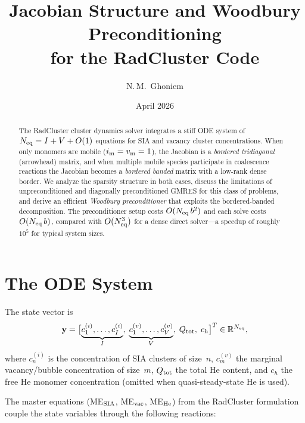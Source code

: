 \documentclass[11pt]{article}
\title{Jacobian Structure and Woodbury Preconditioning\\
for the RadCluster Code}
\author{N.\,M.\ Ghoniem}
\date{April 2026}
\newcommand{\Neq}{N_{\rm eq}}
\newcommand{\im}{i_{\rm m}}
\newcommand{\vm}{v_{\rm m}}
\newcommand{\bw}{b}
\newcommand{\RR}{\mathbb{R}}
\begin{document}
\maketitle

\begin{abstract}
The RadCluster cluster dynamics solver integrates a stiff ODE system
of $\Neq = I + V + O(1)$ equations for SIA and vacancy cluster
concentrations. When only monomers are mobile
($\im = \vm = 1$), the Jacobian is a
\emph{bordered tridiagonal} (arrowhead) matrix, and when multiple
mobile species participate in coalescence reactions the Jacobian
becomes a \emph{bordered banded} matrix with a low-rank dense
border. We analyze the sparsity structure in both cases, discuss the
limitations of unpreconditioned and diagonally preconditioned GMRES
for this class of problems, and derive an efficient
\emph{Woodbury preconditioner} that exploits the bordered-banded
decomposition. The preconditioner setup costs
$O(\Neq\,\bw^{2})$ and each solve costs $O(\Neq\,\bw)$, compared
with $O(\Neq^{3})$ for a dense direct solver---a speedup of roughly
$10^{5}$ for typical system sizes.
\end{abstract}

\tableofcontents

\section{The ODE System}
\label{sec:ode}

The state vector is
\begin{equation}
  \mathbf{y} = \bigl[\underbrace{c_{1}^{(i)},\ldots,c_{I}^{(i)}}_{I},\;
  \underbrace{c_{1}^{(v)},\ldots,c_{V}^{(v)}}_{V},\;
  Q_{\rm tot},\; c_{h}\bigr]^{T} \in \RR^{\Neq},
  \label{eq:state}
\end{equation}
where $c_{n}^{(i)}$ is the concentration of SIA clusters of size~$n$,
$c_{m}^{(v)}$ the marginal vacancy/bubble concentration of
size~$m$, $Q_{\rm tot}$ the total He content, and $c_{h}$ the free He
monomer concentration (omitted when quasi-steady-state He is used).

The master equations (ME$_{\rm SIA}$, ME$_{\rm vac}$, ME$_{\rm He}$) from
the RadCluster formulation~\cite{Ghoniem2026} couple the state
variables through the following reactions:
\end{document}
